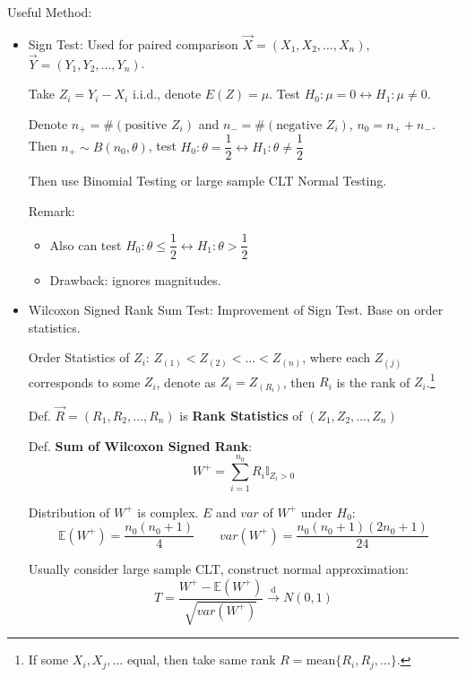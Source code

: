     Useful Method:
    \begin{itemize}
        \item Sign Test: Used for paired comparison $\vec{X}=(X_1,X_2,\ldots,X_n)$, $\vec{Y}=(Y_1,Y_2,\ldots,Y_n)$.
        
        Take $Z_i=Y_i-X_i$ i.i.d., denote $E(Z)=\mu$. Test $H_0:\mu=0\longleftrightarrow H_1:\mu\neq 0$.

        Denote $n_+=\#(\text{positive } Z_i)$ and $n_-=\#(\text{negative }Z_i)$, $n_0=n_++n_-$. Then $n_+\sim B(n_0,\theta)$, test $H_0:\theta=\dfrac{1}{2}\longleftrightarrow H_1:\theta\neq\dfrac{1}{2}$
        
        Then use Binomial Testing or large sample CLT Normal Testing.

        Remark:
        \begin{itemize}
            \item Also can test $H_0:\theta\leq\dfrac{1}{2}\longleftrightarrow H_1:\theta>\dfrac{1}{2}$
            \item Drawback: ignores magnitudes.
        \end{itemize}
        
        \item {}Wilcoxon Signed Rank Sum Test: Improvement of Sign Test. Base on order statistics.
        
        Order Statistics of $Z_i$: $Z_{(1)}<Z_{(2)}<\ldots<Z_{(n)}$, where each $Z_{(j)}$ corresponds to some $Z_i$, denote as $Z_i=Z_{(R_i)}$, then $R_i$ is the rank of $Z_i$.\footnote{If some $X_i,X_j,\ldots$ equal, then take same rank $R=\mathrm{mean}\{R_i,R_j,\ldots\}$.}
        
        Def. $\vec{R}=(R_1,R_2,\ldots,R_n)$ is \textbf{Rank Statistics} of $(Z_1,Z_2,\ldots,Z_n)$

        Def. \textbf{Sum of Wilcoxon Signed Rank}: 
        \begin{equation}
        W^+=\sum_{i=1}^{n_0}R_i\mathbb{I}_{Z_i>0} 
        \end{equation}

        Distribution of $W^+$ is complex. $E$ and $var$ of $W^+$ under $H_0$:
        \begin{equation}
            \mathbb{E}(W^+)=\frac{n_0(n_0+1)}{4}\qquad var(W^+)=\frac{n_0(n_0+1)(2n_0+1)}{24}    
        \end{equation}

        Usually consider large sample CLT, construct normal approximation:
        \begin{equation}
            T=\frac{W^+-\mathbb{E}(W^+)}{\sqrt{var(W^+)}}\xrightarrow[]{\mathrm{d}}N(0,1)
        \end{equation}


\end{itemize}
